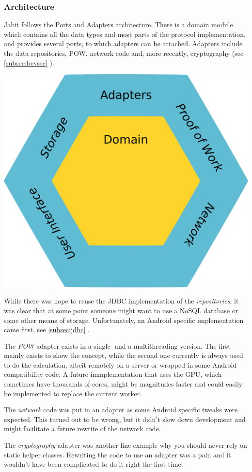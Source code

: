\documentclass{bfh}
\begin{document}
  \subsubsection{Architecture}
  Jabit follows the Ports and Adapters architecture. There is a domain module which contains all the data types and most parts of the protocol implementation, and provides several ports, to which adapters can be attached. Adapters include the data repositories, \ac{POW}, network code and, more recently, cryptography (see \ref{subsec:bcvssc} ).

  \begin{center}
    \includegraphics[width=0.5 \textwidth]{images/ports_and_adapters.pdf}
  \end{center}

  While there was hope to reuse the \acs{JDBC} implementation of the \textit{repositories}, it was clear that at some point someone might want to use a \acs{NoSQL} database or some other means of storage. Unfortunately, an Android specific implementation came first, see \ref{subsec:jdbc} .

  The \textit{\acl{POW}} adapter exists in a single- and a multithreading version. The first mainly exists to show the concept, while the second one currently is always used to do the calculation, albeit remotely on a server or wrapped in some Android compatibility code. A future immplementation that uses the \acs{GPU}, which sometimes have thousands of cores, might be magnitudes faster and could easily be implemented to replace the current worker.

  The \textit{network} code was put in an adapter as some Android specific tweaks were expected. This turned out to be wrong, but it didn't slow down development and might facilitate a future rewrite of the network code.

  The \textit{cryptography} adapter was another fine example why you should never rely on static helper classes. Rewriting the code to use an adapter was a pain and it wouldn't have been complicated to do it right the first time.
\end{document}

